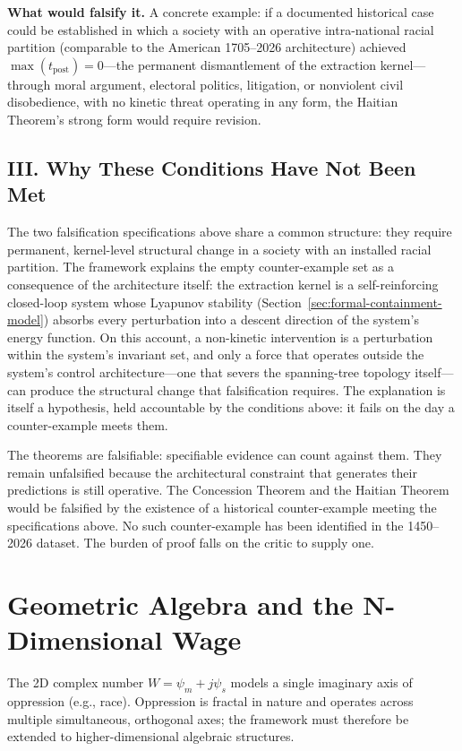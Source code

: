 \textbf{What would falsify it.} A concrete example: if a documented historical case could be established in which a society with an operative intra-national racial partition (comparable to the American 1705--2026 architecture) achieved $\max(t_{\text{post}}) = 0$---the permanent dismantlement of the extraction kernel---through moral argument, electoral politics, litigation, or nonviolent civil disobedience, with no kinetic threat operating in any form, the Haitian Theorem's strong form would require revision.

\section*{III. Why These Conditions Have Not Been Met}

The two falsification specifications above share a common structure: they require permanent, kernel-level structural change in a society with an installed racial partition. The framework explains the empty counter-example set as a consequence of the architecture itself: the extraction kernel is a self-reinforcing closed-loop system whose Lyapunov stability (Section~\ref{sec:formal-containment-model}) absorbs every perturbation into a descent direction of the system's energy function. On this account, a non-kinetic intervention is a perturbation within the system's invariant set, and only a force that operates outside the system's control architecture---one that severs the spanning-tree topology itself---can produce the structural change that falsification requires. The explanation is itself a hypothesis, held accountable by the conditions above: it fails on the day a counter-example meets them.

The theorems are falsifiable: specifiable evidence can count against them. They remain unfalsified because the architectural constraint that generates their predictions is still operative. The Concession Theorem and the Haitian Theorem would be falsified by the existence of a historical counter-example meeting the specifications above. No such counter-example has been identified in the 1450--2026 dataset. The burden of proof falls on the critic to supply one.

\chapter{Geometric Algebra and the N-Dimensional Wage}
\label{apx:geometric_algebra}

The 2D complex number $W = \psi_m + j\psi_s$ models a single imaginary axis of oppression (e.g., race). Oppression is fractal in nature and operates across multiple simultaneous, orthogonal axes; the framework must therefore be extended to higher-dimensional algebraic structures.

